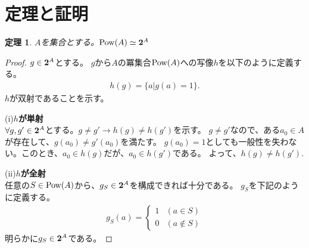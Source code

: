 \documentclass{jsarticle}
\newtheorem{Theorem}{定理}
\newcommand{\Pow}{ {\rm Pow} }
\newcommand{\2}{ {\bf 2} }
\begin{document}
    \section{定理と証明}
    \begin{Theorem}
        $A$を集合とする。$\Pow(A) \simeq {\2}^A$
    \end{Theorem}
    \begin{proof}
        $g \in {\2}^A$とする。
        $g$から$A$の冪集合$\Pow(A)$への写像$h$を以下のように定義する。
        \begin{align*}
            h(g) = \{ a | g(a)=1 \}.
        \end{align*}
        $h$が双射であることを示す。

        (i){\bf $h$が単射} \\
        $\forall g,g' \in \2^A$とする。$g \neq g' \rightarrow h(g) \neq h(g')$を示す。
        $g \neq g'$なので、ある$a_0 \in A$が存在して、$g(a_0) \neq g'(a_0)$を満たす。
        $g(a_0) = 1$としても一般性を失わない。このとき、$a_0 \in h(g)$だが、$a_0 \in h(g')$である。
        よって、$h(g) \neq h(g')$.

        (ii){\bf $h$が全射} \\
        任意の$S \in \Pow(A)$から、$g_S \in \2^A$を構成できれば十分である。
        $g_S$を下記のように定義する。
        \begin{align*}
            g_S(a) = \begin{cases}
                1 & (a \in S) \\
                0 & (a \notin S)
            \end{cases}
        \end{align*}
        明らかに$g_S \in \2^A$である。
    \end{proof}
    
\end{document}
